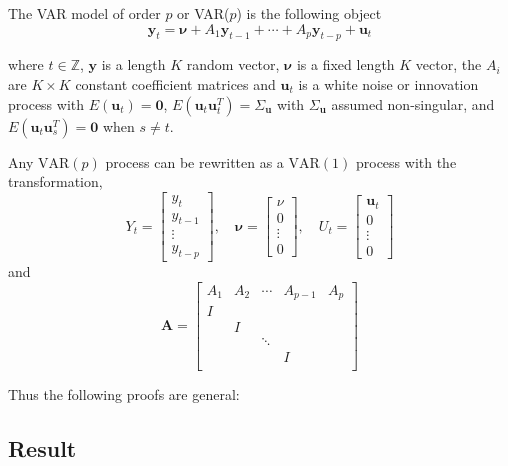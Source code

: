 \documentclass{article}
\begin{document}
            The VAR model of order $p$ or VAR($p$) is the following object
            \[
                \bm{y}_t = \bm{\nu} + A_1 \bm{y}_{t-1} + \cdots + A_p \bm{y}_{t-p} + \bm{u}_t
            \]

            where $t \in \mathbb{Z}$, $\bm{y}$ is a length $K$ random vector,
            $\bm{\nu}$ is a fixed length $K$ vector, the $A_i$ are $K \times K$
            constant coefficient matrices and $\bm{u}_t$ is a white noise
            or innovation process with $E(\bm{u}_t) = \bm{0}$, 
            $E(\bm{u}_t \bm{u}_t^T) = \Sigma_{\bm{u}}$ with 
            $\Sigma_{\bm{u}}$ assumed non-singular, and 
            $E(\bm{u}_t \bm{u}_s^T) = \bm{0}$ when $s \neq t$.

            Any $\text{VAR}(p)$ process can be rewritten as a $\text{VAR}(1)$
            process with the transformation,
            \[
                Y_t = \begin{bmatrix}y_t \\ y_{t-1} \\ \vdots  \\ y_{t - p} \end{bmatrix},
                \quad
                \bm{\nu} = \begin{bmatrix} \nu \\ 0 \\ \vdots \\ 0 \end{bmatrix}, 
                \quad
                U_t = \begin{bmatrix} \bm{u}_t \\ 0 \\ \vdots \\ 0 \end{bmatrix}
            \]
            and
            \[
                \bm{A} = \begin{bmatrix}
                   A_1 & A_2 & \cdots & A_{p-1} & A_p \\
                   I & & & & \\
                   & I & & & \\
                   & & \ddots & & \\
                   & & & I & \\
                \end{bmatrix}
            \]
            
            Thus the following proofs are general:

            \subsection{Result}
\end{document}
